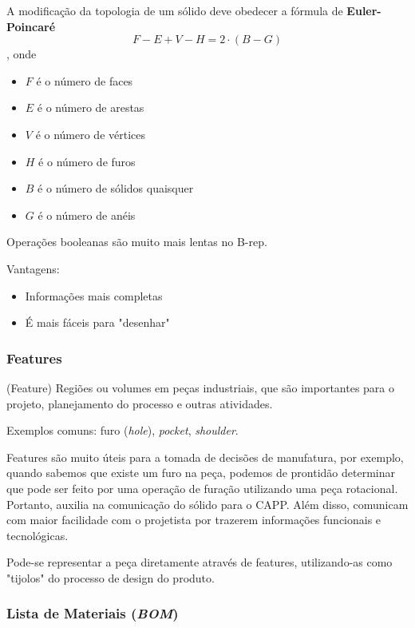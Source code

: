 \documentclass[a4paper]{report}
\begin{document}
A modificação da topologia de um sólido deve obedecer a fórmula de \textbf{Euler-Poincaré} \[
    F - E + V - H = 2 \cdot (B-G)
\], onde
\begin{itemize}
    \item $F$ é o número de faces
    \item $E$ é o número de arestas
    \item $V$ é o número de vértices
    \item $H$ é o número de furos
    \item $B$ é o número de sólidos quaisquer
    \item $G$ é o número de anéis
\end{itemize}

Operações booleanas são muito mais lentas no B-rep.

Vantagens:
\begin{itemize}
    \item Informações mais completas
    \item É mais fáceis para "desenhar"
\end{itemize}

\subsubsection*{Features}

\begin{definition}
    (Feature) Regiões ou volumes em peças industriais, que são importantes para o projeto, planejamento do processo e outras atividades.
\end{definition}

Exemplos comuns: furo (\emph{hole}), \emph{pocket}, \emph{shoulder}.

Features são muito úteis para a tomada de decisões de manufatura, por exemplo, quando sabemos que existe um furo na peça, podemos de prontidão determinar que pode ser feito por uma operação de furação utilizando uma peça rotacional. Portanto, auxilia na comunicação do sólido para o CAPP. Além disso, comunicam com maior facilidade com o projetista por trazerem informações funcionais e tecnológicas.

Pode-se representar a peça diretamente através de features, utilizando-as como "tijolos" do processo de design do produto.

\subsubsection*{Lista de Materiais (\emph{BOM})}
\end{document}
